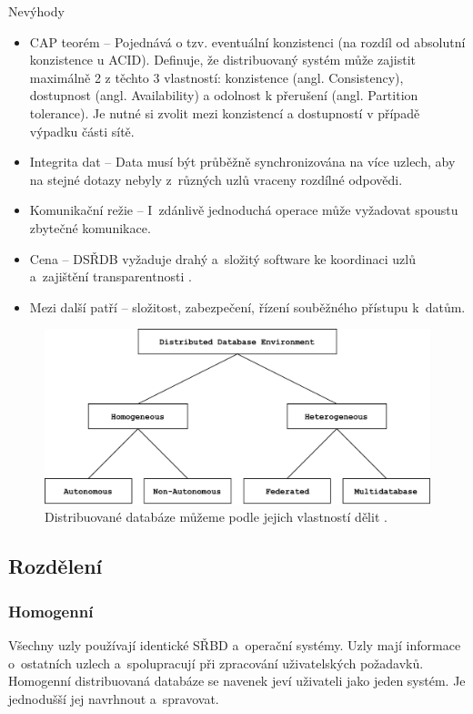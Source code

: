 \noindent Nevýhody
\begin{itemize}
\item CAP teorém -- Pojednává o tzv. eventuální konzistenci (na rozdíl od absolutní konzistence u ACID). Definuje, že distribuovaný systém může zajistit maximálně 2 z těchto 3 vlastností: konzistence (angl. Consistency), dostupnost (angl. Availability) a odolnost k přerušení (angl. Partition tolerance). Je nutné si zvolit mezi konzistencí a dostupností v případě výpadku části sítě.

\item Integrita dat -- Data musí být průběžně synchronizována na více uzlech, aby na stejné dotazy nebyly z~různých uzlů vraceny rozdílné odpovědi.

\item Komunikační režie -- I~zdánlivě jednoduchá operace může vyžadovat spoustu zbytečné komunikace.

\item Cena -- DSŘDB vyžaduje drahý a~složitý software ke koordinaci uzlů a~zajištění transparentnosti \cite{distributedDBMS}.

\item Mezi další patří -- složitost, zabezpečení, řízení souběžného přístupu k~datům.
\end{itemize}

\begin{figure}[!h]
  \centering
  \includegraphics[width=14.2cm]{template-fig/DistributedDatabasesClassification.pdf}
  \caption{Distribuované databáze můžeme podle jejich vlastností dělit \cite{distributedDBMS}.}
  \label{FIG_DivDistrDB}
\end{figure}

\subsection{Rozdělení}
\subsubsection{Homogenní}
Všechny uzly používají identické SŘBD a~operační systémy. Uzly mají informace o~ostatních uzlech a~spolupracují při zpracování uživatelských požadavků. Homogenní distribuovaná databáze se navenek jeví uživateli jako jeden systém. Je jednodušší jej navrhnout a~spravovat.


